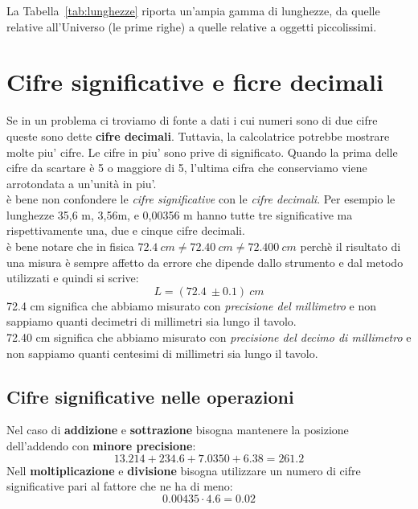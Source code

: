 \documentclass[12pt]{report}
\begin{document}
	La Tabella~\ref{tab:lunghezze} riporta un'ampia gamma di lunghezze, da quelle relative all'Universo (le prime righe) a quelle relative a oggetti piccolissimi.
	\section{Cifre significative e ficre decimali}
	Se in un problema ci troviamo di fonte a dati i cui numeri sono di due cifre queste sono dette \textbf{cifre decimali}. Tuttavia, la calcolatrice potrebbe mostrare molte piu' cifre. Le cifre in piu' sono prive di significato. Quando la prima delle cifre da scartare è  5 o maggiore di 5, l'ultima cifra che conserviamo viene arrotondata a un'unità in piu'. \\
	è  bene non confondere le \textit{cifre significative} con le \textit{cifre decimali}. Per esempio le lunghezze 35,6 m, 3,56m, e 0,00356 m hanno tutte tre significative ma rispettivamente una, due e cinque cifre decimali. \\
	è  bene notare che in fisica $72.4\ cm \neq 72.40\ cm \neq 72.400\ cm$ perchè  il risultato di una misura è  sempre affetto da errore che dipende dallo strumento e dal metodo utilizzati e quindi si scrive:
	\[
	L = (72.4\ \pm 0.1)\ cm
	\]
	72.4 cm significa che abbiamo misurato con \textit{precisione del millimetro} e non sappiamo quanti decimetri di millimetri sia lungo il tavolo. \\
	72.40 cm significa che abbiamo misurato con \textit{precisione del decimo di millimetro} e non sappiamo quanti centesimi di millimetri sia lungo il tavolo. \\
	\subsection{Cifre significative nelle operazioni}
	Nel caso di \textbf{addizione} e \textbf{sottrazione} bisogna mantenere la posizione dell'addendo con \textbf{minore precisione}:
	\[
	13.214 + 234.6 + 7.0350 + 6.38 = 261.2
	\]
	Nell \textbf{moltiplicazione} e \textbf{divisione} bisogna utilizzare un numero di cifre significative pari al fattore che ne ha di meno:
	\[
	0.00435 \cdot 4.6 = 0.02
	\]
\end{document}
